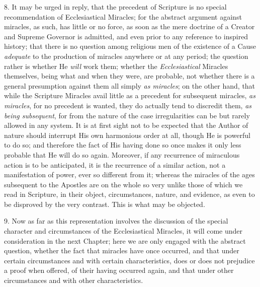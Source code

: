 8.
It may be urged in reply, that the precedent of Scripture is no
special recommendation of Ecclesiastical Miracles; for the abstract
argument against miracles, as such, has little or no force, as soon as
the mere doctrine of a Creator and Supreme Governor is admitted, and
even prior to any reference to inspired history; that there is no
question among religious men of the existence of a Cause \emph{adequate}
to the production of miracles anywhere or at any period; the question
rather is whether He \emph{will} work them; whether the \emph{Ecclesiastical}
Miracles themselves, being what and when they were, are probable, not
whether there is a general presumption against them all simply \emph{as
miracles}; on the other hand, that while the Scripture Miracles
avail little as a precedent for subsequent miracles, \emph{as miracles},
for no precedent is wanted, they do actually tend to discredit them, \emph{as
being subsequent}, for from the nature of the case irregularities
can be but rarely allowed in any system. It is at first sight
not to be expected that the Author of nature should interrupt His own
harmonious order at all, though He is powerful to do so; and therefore
the fact of His having done so once makes it only less probable that
He will do so again. Moreover, if any recurrence of miraculous action
is to be anticipated, it is the recurrence of a similar action, not a
manifestation of power, ever so different from it; whereas the
miracles of the ages subsequent to the Apostles are on the whole so
very unlike those of which we read in Scripture, in their object,
circumstances, nature, and evidence, as even to be disproved by the
very contrast. This is what may be objected.

9.
Now as far as this representation involves the discussion of the
special character and circumstances of the Ecclesiastical Miracles, it
will come under consideration in the next Chapter; here we are only
engaged with the abstract question, whether the fact that miracles
have once occurred, and that under certain circumstances and with
certain characteristics, does or does not prejudice a proof when
offered, of their having occurred again, and that under other
circumstances
and with other characteristics.

